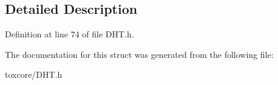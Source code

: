 \subsection{Detailed Description}


Definition at line 74 of file D\+H\+T.\+h.



The documentation for this struct was generated from the following file\+:\begin{DoxyCompactItemize}
\item 
toxcore/D\+H\+T.\+h\end{DoxyCompactItemize}
